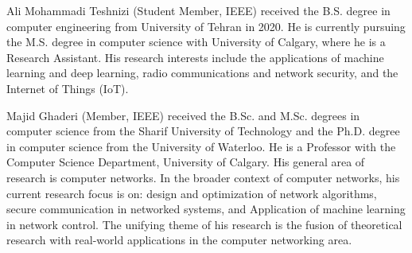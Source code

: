 \enlargethispage{.7in}
 \baselineskip
% 
\begin{IEEEbiography}{Ali Mohammadi Teshnizi}
	(Student Member, IEEE) received the B.S. degree in computer engineering from
	University of Tehran in 2020. He is currently pursuing the M.S. degree in computer science with University of Calgary, where he is a Research
	Assistant. His research interests include the applications of machine learning and deep learning, radio communications and network security, and the Internet of Things (IoT).
\end{IEEEbiography}
 \baselineskip
\begin{IEEEbiography}
	{Majid Ghaderi}
(Member, IEEE) received the B.Sc. and M.Sc. degrees in computer science from the Sharif University of Technology and the Ph.D. degree in computer science from the University of Waterloo. He is a Professor with the Computer Science Department, University of Calgary. His general area of research is computer networks. In the broader context of computer networks, his current research focus is on: design and optimization of network algorithms, secure communication in networked systems, and Application of machine learning in network control. The unifying theme of his research is the fusion of theoretical research with real-world applications in the computer networking area.
\end{IEEEbiography}
